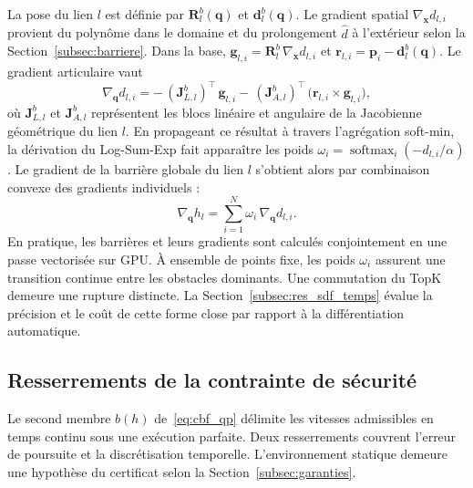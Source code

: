 La pose du lien $l$ est définie par $\mathbf{R}_{l}^{b}(\mathbf{q})$ et $\mathbf{d}_{l}^{b}(\mathbf{q})$. Le gradient spatial $\nabla_{\mathbf{x}}d_{l,i}$ provient du polynôme dans le domaine et du prolongement $\hat d$ à l'extérieur selon la Section~\ref{subsec:barriere}. Dans la base, $\mathbf{g}_{l,i} = \mathbf{R}_{l}^{b}\,\nabla_{\mathbf{x}}d_{l,i}$ et $\mathbf{r}_{l,i} = \mathbf{p}_i - \mathbf{d}_{l}^{b}(\mathbf{q})$. Le gradient articulaire vaut
\begin{equation}
\boxed{\;
\nabla_{\mathbf{q}}d_{l,i} =
-\,(\mathbf{J}_{L,l}^{b})^{\top}\,\mathbf{g}_{l,i}
-\,(\mathbf{J}_{A,l}^{b})^{\top}\,\big(\mathbf{r}_{l,i}\times\mathbf{g}_{l,i}\big),
\;}
\end{equation}
où $\mathbf{J}_{L,l}^{b}$ et $\mathbf{J}_{A,l}^{b}$ représentent les blocs linéaire et angulaire de la Jacobienne géométrique du lien $l$. En propageant ce résultat à travers l'agrégation soft-min, la dérivation du Log-Sum-Exp fait apparaître les poids $\omega_i = \operatorname{softmax}_i(-d_{l,i}/\alpha)$. Le gradient de la barrière globale du lien $l$ s'obtient alors par combinaison convexe des gradients individuels :
\begin{equation}
\boxed{\;
\nabla_{\mathbf{q}}h_l = \sum_{i=1}^{N} \omega_i\,\nabla_{\mathbf{q}}d_{l,i}.
\;}
\end{equation}
En pratique, les barrières et leurs gradients sont calculés conjointement en une passe vectorisée sur GPU. À ensemble de points fixe, les poids $\omega_i$ assurent une transition continue entre les obstacles dominants. Une commutation du TopK demeure une rupture distincte. La Section~\ref{subsec:res_sdf_temps} évalue la précision et le coût de cette forme close par rapport à la différentiation automatique.

\subsection{Resserrements de la contrainte de sécurité}\label{subsec:contrainte}
Le second membre $b(h)$ de~\eqref{eq:cbf_qp} délimite les vitesses admissibles en temps continu sous une exécution parfaite. Deux resserrements couvrent l'erreur de poursuite et la discrétisation temporelle. L'environnement statique demeure une hypothèse du certificat selon la Section~\ref{subsec:garanties}.

